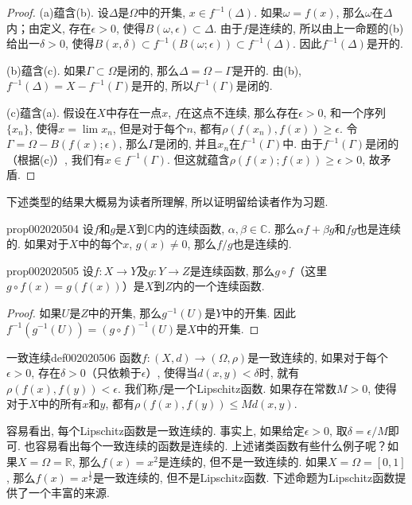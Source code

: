 \begin{proof}
(a)蕴含(b). 设$\Delta$是$\Omega$中的开集, $x \in f^{-1}(\Delta)$. 如果$\omega = f(x)$, 那么$\omega$在$\Delta$内；由定义, 存在$\epsilon > 0$, 使得$B(\omega, \epsilon) \subset \Delta$. 由于$f$是连续的, 所以由上一命题的(b)给出一$\delta > 0$, 使得$B(x, \delta) \subset f^{-1}(B(\omega; \epsilon)) \subset f^{-1}(\Delta)$. 因此$f^{-1}(\Delta)$是开的. 

(b)蕴含(c). 如果$\Gamma \subset \Omega$是闭的, 那么$\Delta = \Omega - \Gamma$是开的. 由(b), $f^{-1}(\Delta) = X - f^{-1}(\Gamma)$是开的, 所以$f^{-1}(\Gamma)$是闭的. 

(c)蕴含(a). 假设在$X$中存在一点$x$, $f$在这点不连续, 那么存在$\epsilon > 0$, 和一个序列$\{x_n\}$, 使得$x = \lim{x_n}$, 但是对于每个$n$, 都有$\rho(f(x_n), f(x)) \ge \epsilon$. 令$\Gamma = \Omega - B(f(x); \epsilon)$, 那么$\Gamma$是闭的, 并且$x_n$在$f^{-1}(\Gamma)$中. 由于$f^{-1}(\Gamma)$是闭的（根据(c)）, 我们有$x \in f^{-1}(\Gamma)$. 但这就蕴含$\rho(f(x);f(x)) \ge \epsilon > 0$, 故矛盾. 
\end{proof}

下述类型的结果大概易为读者所理解, 所以证明留给读者作为习题. 
\begin{proposition}{}{prop002020504}
设$f$和$g$是$X$到$\mathbb{C}$内的连续函数, $\alpha, \beta \in \mathbb{C}$. 那么$\alpha{}f + \beta{}g$和$fg$也是连续的. 如果对于$X$中的每个$x$, $g(x) \neq 0$, 那么$f/g$也是连续的. 
\end{proposition}

\begin{proposition}{}{prop002020505}
设$f: X \to Y$及$g:Y \to Z$是连续函数, 那么$g \circ f$（这里$g \circ f(x) = g(f(x))$）是$X$到$Z$内的一个连续函数. 
\end{proposition}

\begin{proof}
如果$U$是$Z$中的开集, 那么$g^{-1}(U)$是$Y$中的开集. 因此$f^{-1}(g^{-1}(U))=(g \circ f)^{-1}(U)$是$X$中的开集. 
\end{proof}

\begin{definition}{一致连续}{def002020506}
函数$f:(X, d) \to (\Omega, \rho)$是一致连续的, 如果对于每个$\epsilon > 0$, 存在$\delta > 0$（只依赖于$\epsilon$）, 使得当$d(x, y) < \delta$时, 就有$\rho(f(x), f(y)) < \epsilon$. 我们称$f$是一个Lipschitz函数. 如果存在常数$M > 0$, 使得对于$X$中的所有$x$和$y$, 都有$\rho(f(x), f(y)) \le Md(x, y)$. 
\end{definition}

容易看出, 每个Lipschitz函数是一致连续的. 事实上, 如果给定$\epsilon > 0$, 取$\delta = \epsilon / M$即可. 也容易看出每个一致连续的函数是连续的. 上述诸类函数有些什么例子呢？如果$X = \Omega = \mathbb{R}$, 那么$f(x)=x^2$是连续的, 但不是一致连续的. 如果$X = \Omega = [0,1]$, 那么$f(x) = x^{\frac{1}{2}}$是一致连续的, 但不是Lipschitz函数. 下述命题为Lipschitz函数提供了一个丰富的来源. 

